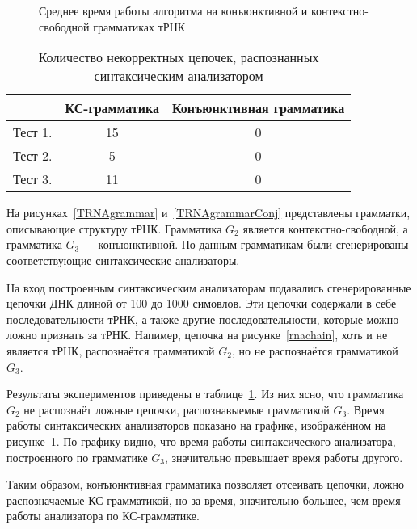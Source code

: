 \begin{figure}
\begin{center}
\end{center}
\caption{Среднее время работы алгоритма на конъюнктивной и контекстно-свободной грамматиках тРНК}
\label{time}
\end{figure}

\begin{table}[h]
\begin{center}
  \begin{tabular}{ c | c | c }
    \hline
     & КС-грамматика & Конъюнктивная грамматика \\ \hline
    Тест 1. & 15 & 0 \\\hline
    Тест 2. & 5 & 0 \\\hline
    Тест 3. & 11 & 0 \\
    \hline
  \end{tabular}
\end{center}
\caption{Количество некорректных цепочек, распознанных синтаксическим анализатором}
\label{mistakes}
\end{table}

На рисунках~\ref{TRNAgrammar} и~\ref{TRNAgrammarConj} представлены грамматки, описывающие структуру тРНК. Грамматика $G_2$ является контекстно-свободной, а грамматика $G_3$ --- конъюнктивной. По данным грамматикам были сгенерированы соответствующие синтаксические анализаторы.

На вход построенным синтаксическим анализаторам подавались сгенерированные цепочки ДНК длиной от 100 до 1000 симовлов. Эти цепочки содержали в себе последовательности тРНК, а также другие последовательности, которые можно ложно признать за тРНК. Напимер, цепочка на рисунке~\ref{rnachain}, хоть и не является тРНК, распознаётся грамматикой $G_2$, но не распознаётся грамматикой $G_3$.

Результаты экспериментов приведены в таблице~\ref{mistakes}. Из них ясно, что грамматика $G_2$ не распознаёт ложные цепочки, распознавыемые грамматикой $G_3$. Время работы синтаксических анализаторов показано на графике, изображённом на рисунке~\ref{time}. По графику видно, что время работы синтаксического анализатора, построенного по грамматике $G_3$, значительно превышает время работы другого.

Таким образом, конъюнктивная грамматика позволяет отсеивать цепочки, ложно распозначаемые КС-грамматикой, но за время, значительно большее, чем время работы анализатора по КС-грамматике.
